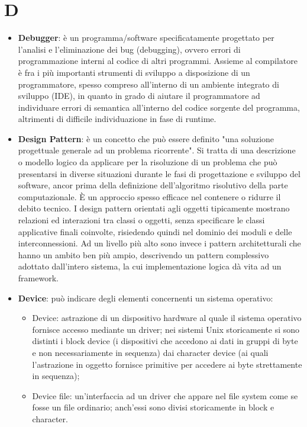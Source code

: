 \section{D}
\begin{itemize} 
	\item
	\textbf{Debugger}: è un programma/software specificatamente progettato per l'analisi e l'eliminazione dei bug (debugging), ovvero errori di programmazione interni al codice di altri programmi. Assieme al compilatore è fra i più importanti strumenti di sviluppo a disposizione di un programmatore, spesso compreso all'interno di un ambiente integrato di sviluppo (IDE), in quanto in grado di aiutare il programmatore ad individuare errori di semantica all'interno del codice sorgente del programma, altrimenti di difficile individuazione in fase di runtime.
	\item
	\textbf{Design Pattern}: è un concetto che può essere definito "una soluzione progettuale generale ad un problema ricorrente". Si tratta di una descrizione o modello logico da applicare per la risoluzione di un problema che può presentarsi in diverse situazioni durante le fasi di progettazione e sviluppo del software, ancor prima della definizione dell'algoritmo risolutivo della parte computazionale. È un approccio spesso efficace nel contenere o ridurre il debito tecnico.
	I design pattern orientati agli oggetti tipicamente mostrano relazioni ed interazioni tra classi o oggetti, senza specificare le classi applicative finali coinvolte, risiedendo quindi nel dominio dei moduli e delle interconnessioni. Ad un livello più alto sono invece i pattern architetturali che hanno un ambito ben più ampio, descrivendo un pattern complessivo adottato dall'intero sistema, la cui implementazione logica dà vita ad un framework.
	\item
	\textbf{Device}: può indicare degli elementi concernenti un sistema operativo:
	 \begin{itemize} 
	\item Device: astrazione di un dispositivo hardware al quale il sistema operativo fornisce accesso mediante un driver; nei sistemi Unix storicamente si sono distinti i block device (i dispositivi che accedono ai dati in gruppi di byte e non necessariamente in sequenza) dai character device (ai quali l'astrazione in oggetto fornisce primitive per accedere ai byte strettamente in sequenza);
 	\item Device file: un'interfaccia ad un driver che appare nel file system come se fosse un file ordinario; anch'essi sono divisi storicamente in block e character.

\end{itemize}
\end{itemize}
